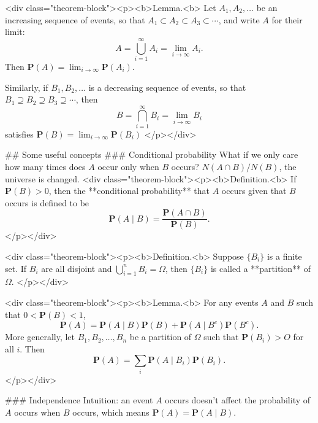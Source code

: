 <div class="theorem-block"><p><b>Lemma.<b> 
Let $A_1, A_2, \dots$ be an increasing sequence of events, so that $A_1 \subset A_2 \subset A_3 \subset \cdots$, and write $A$ for their limit:
$$\begin{equation}
    A = \bigcup_{i=1}^\infty A_i = \lim_{i \to \infty} A_i.
\end{equation}$$
Then $\mathbf{P}(A) = \lim_{i\to\infty} \mathbf{P}(A_i)$. 

Similarly, if $B_1, B_2, \dots$ is a decreasing sequence of events, so that $B_1 \supseteq  B_2 \supseteq B_3 \supseteq \cdots$, then 
$$\begin{equation}
    B = \bigcap_{i=1}^\infty B_i = \lim_{i \to \infty} B_i
\end{equation}$$
satisfies $\mathbf{P}(B) = \lim_{i\to\infty} \mathbf{P}(B_i)$
</p></div>


## Some useful concepts
### Conditional probability
What if we only care how many times does $A$ occur only when $B$ occurs? $N(A\cap B) / N(B)$, the universe is changed. 
<div class="theorem-block"><p><b>Definition.<b> 
If $\mathbf{P}(B) > 0$, then the **conditional probability** that $A$ occurs given that $B$ occurs is defined to be
$$\begin{equation}
    \mathbf{P}(A \;\vert\; B) = \frac{\mathbf{P}(A \cap B)}{\mathbf{P}(B)}.
\end{equation}$$
</p></div>

<div class="theorem-block"><p><b>Definition.<b> 
Suppose $\{B_i\}$ is a finite set. If $B_i$ are all disjoint and $\bigcup_{i=1}^n B_i = \Omega$, then $\{B_i\}$ is called a **partition** of $\Omega$.
</p></div>

<div class="theorem-block"><p><b>Lemma.<b> 
For any events $A$ and $B$ such that $0 < \mathbf{P}(B) < 1$,
$$\begin{equation}
    \mathbf{P}(A) = \mathbf{P}(A \;\vert\; B) \mathbf{P}(B) + \mathbf{P}(A \;\vert\; B^c) \mathbf{P}(B^c).
\end{equation}$$
More generally, let $B_1,  B_2, \dots, B_n$ be a partition of $\Omega$ such that $\mathbf{P}(B_i) > O$ for all $i$. Then 
$$\begin{equation}
    \mathbf{P}(A) = \sum_i \mathbf{P}(A \;\vert\; B_i) \mathbf{P}(B_i).
\end{equation}$$
</p></div>

### Independence
Intuition: an event $A$ occurs doesn't affect the probability of $A$ occurs when $B$ occurs, which means $\mathbf{P}(A) = \mathbf{P}(A\;\vert\; B)$.

